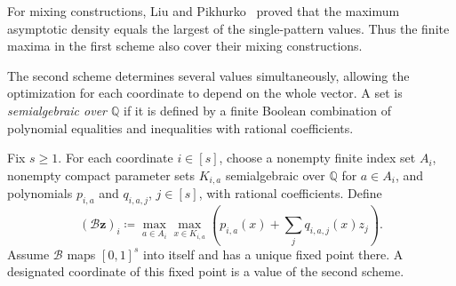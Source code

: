 \documentclass[10pt]{article}
\numberwithin{equation}{section}
\theoremstyle{definition}
\begin{document}
For mixing constructions, Liu and Pikhurko~\cite[Lemma~3.4]{LiuPikhurko2025} proved that the maximum asymptotic density equals the largest of the single-pattern values. Thus the finite maxima in the first scheme also cover their mixing constructions.

The second scheme determines several values simultaneously, allowing the optimization for each coordinate to depend on the whole vector. A set is \emph{semialgebraic over $\mathbb Q$} if it is defined by a finite Boolean combination of polynomial equalities and inequalities with rational coefficients.

Fix $s\ge1$. For each coordinate $i\in[s]$, choose a nonempty finite index set $A_i$, nonempty compact parameter sets $K_{i,a}$ semialgebraic over $\mathbb Q$ for $a\in A_i$, and polynomials $p_{i,a}$ and $q_{i,a,j}$, $j\in[s]$, with rational coefficients. Define
\[
 (\mathcal B\boldsymbol z)_i\coloneqq
 \max_{a\in A_i}\max_{x\in K_{i,a}}
       \left(p_{i,a}(x)+\sum_jq_{i,a,j}(x)z_j\right).
\]
Assume $\mathcal B$ maps $[0,1]^s$ into itself and has a unique fixed point there. A designated coordinate of this fixed point is a value of the second scheme.
\end{document}

